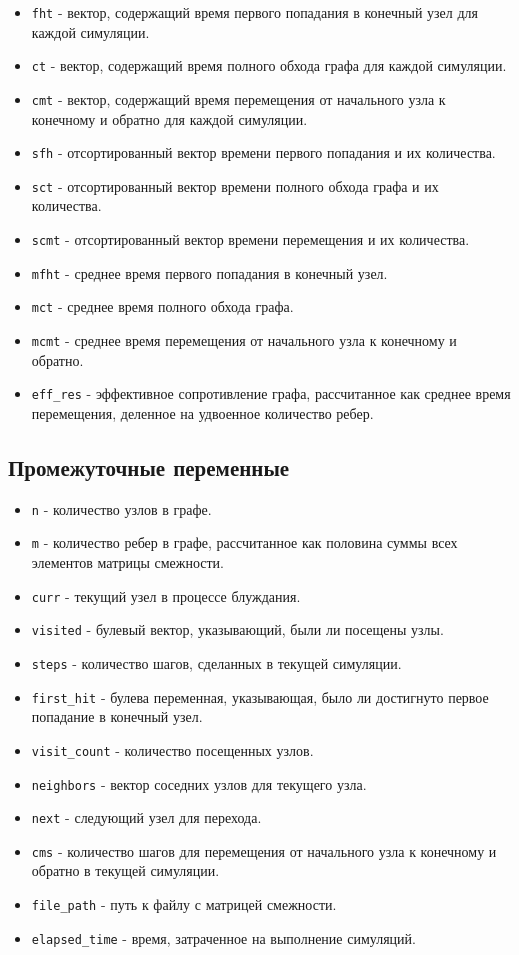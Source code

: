 \documentclass[utf8x]{G7-32} %
\begin{document}
\begin{itemize}
    \item \texttt{fht} - вектор, содержащий время первого попадания в конечный узел для каждой симуляции.
    \item \texttt{ct} - вектор, содержащий время полного обхода графа для каждой симуляции.
    \item \texttt{cmt} - вектор, содержащий время перемещения от начального узла к конечному и обратно для каждой симуляции.
    \item \texttt{sfh} - отсортированный вектор времени первого попадания и их количества.
    \item \texttt{sct} - отсортированный вектор времени полного обхода графа и их количества.
    \item \texttt{scmt} - отсортированный вектор времени перемещения и их количества.
    \item \texttt{mfht} - среднее время первого попадания в конечный узел.
    \item \texttt{mct} - среднее время полного обхода графа.
    \item \texttt{mcmt} - среднее время перемещения от начального узла к конечному и обратно.
    \item \texttt{eff_res} - эффективное сопротивление графа, рассчитанное как среднее время перемещения, деленное на удвоенное количество ребер.
\end{itemize}

\subsection{Промежуточные переменные}

\begin{itemize}
    \item \texttt{n} - количество узлов в графе.
    \item \texttt{m} - количество ребер в графе, рассчитанное как половина суммы всех элементов матрицы смежности.
    \item \texttt{curr} - текущий узел в процессе блуждания.
    \item \texttt{visited} - булевый вектор, указывающий, были ли посещены узлы.
    \item \texttt{steps} - количество шагов, сделанных в текущей симуляции.
    \item \texttt{first_hit} - булева переменная, указывающая, было ли достигнуто первое попадание в конечный узел.
    \item \texttt{visit_count} - количество посещенных узлов.
    \item \texttt{neighbors} - вектор соседних узлов для текущего узла.
    \item \texttt{next} - следующий узел для перехода.
    \item \texttt{cms} - количество шагов для перемещения от начального узла к конечному и обратно в текущей симуляции.
    \item \texttt{file_path} - путь к файлу с матрицей смежности.
    \item \texttt{elapsed_time} - время, затраченное на выполнение симуляций.
\end{itemize}
\end{document}

